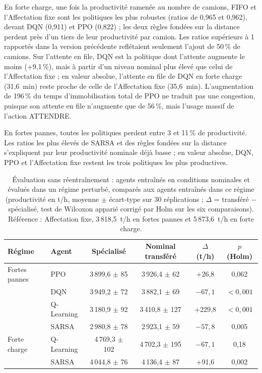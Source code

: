 \documentclass[11pt,a4paper]{article}
\newif\ifrevmarks
\newcommand{\revtag}[1]{\ifrevmarks\textsuperscript{\textcolor{red!70!black}{\scriptsize[#1]}}\fi}
\newcommand{\rev}[2]{\ifrevmarks{\color{revcolor}#2}\revtag{#1}\else#2\fi}
\newenvironment{revbloc}[1]{\par\ifrevmarks\color{revcolor}\noindent\revtag{#1}\ \fi}{\par}
\begin{document}
\begin{revbloc}{M15, M17, M18}
En forte charge, une fois la productivité ramenée au nombre de camions, FIFO et l'Affectation fixe sont les politiques les plus robustes (ratios de 0,965 et 0,962), devant DQN (0,911) et PPO (0,822) ; les deux règles fondées sur la distance perdent près d'un tiers de leur productivité par camion. Les ratios supérieurs à 1 rapportés dans la version précédente reflétaient seulement l'ajout de 50\,\% de camions. Sur l'attente en file, DQN est la politique dont l'attente augmente le moins (+9,1\,\%), mais à partir d'un niveau nominal plus élevé que celui de l'Affectation fixe ; en valeur absolue, l'attente en file de DQN en forte charge (31,6~min) reste proche de celle de l'Affectation fixe (35,6~min). L'augmentation de 196\,\% du temps d'immobilisation total de PPO ne traduit pas une congestion, puisque son attente en file n'augmente que de 56\,\%, mais l'usage massif de l'action ATTENDRE.

En fortes pannes, toutes les politiques perdent entre 3 et 11\,\% de productivité. Les ratios les plus élevés de SARSA et des règles fondées sur la distance s'expliquent par leur productivité nominale déjà basse ; en valeur absolue, DQN, PPO et l'Affectation fixe restent les trois politiques les plus productives.
\end{revbloc}

\begin{table}[H]
\centering
\caption{\rev{M1, QR3}{Évaluation sans réentraînement : agents entraînés en conditions nominales et évalués dans un régime perturbé, comparés aux agents entraînés dans ce régime (productivité en t/h, moyenne $\pm$ écart-type sur 30 réplications ; $\Delta$ = transféré $-$ spécialisé, test de Wilcoxon apparié corrigé par Holm sur les six comparaisons). Référence : Affectation fixe, 3\,818,5~t/h en fortes pannes et 5\,873,6~t/h en forte charge.}}
\label{tab:transfer}
\small
\setlength{\tabcolsep}{4pt}
\begin{tabular}{llcccc}
\toprule
\textbf{Régime} & \textbf{Agent} & \textbf{Spécialisé} & \textbf{Nominal transféré} & \textbf{$\Delta$ (t/h)} & \textbf{$p$ (Holm)} \\
\midrule
Fortes pannes & PPO        & 3\,899,6 $\pm$ 85  & 3\,926,4 $\pm$ 62  & +26,8   & 0,062 \\
              & DQN        & 3\,949,2 $\pm$ 72  & 3\,882,1 $\pm$ 69  & $-67{,}1$ & $<0{,}001$ \\
              & Q-Learning & 3\,180,9 $\pm$ 92  & 3\,410,8 $\pm$ 127 & +229,8  & $<0{,}001$ \\
              & SARSA      & 2\,980,8 $\pm$ 78  & 2\,923,1 $\pm$ 59  & $-57{,}8$ & 0,005 \\
Forte charge  & Q-Learning & 4\,769,3 $\pm$ 102 & 4\,702,3 $\pm$ 195 & $-67{,}1$ & 0,18 \\
              & SARSA      & 4\,044,8 $\pm$ 76  & 4\,136,4 $\pm$ 87  & +91,6   & 0,002 \\
\bottomrule
\end{tabular}
\end{table}
\end{document}
